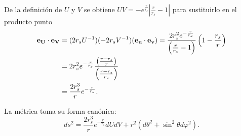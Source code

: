 De la definición de \( U \) y \( V \) se obtiene $UV = -e^{\frac{r}{r_s}}\left|\frac{r}{r_s} - 1\right|$ para sustituirlo en el producto punto
\begin{equation}
    \begin{aligned}
        \mathbf{e_U} \cdot \mathbf{e_V} & = (2r_s U^{-1})(-2r_s V^{-1})(\mathbf{e_u} \cdot \mathbf{e_v}) = \frac{2r_s^2 e^{-\frac{r}{r_s}}}{\left(\frac{r}{r_s} - 1\right)}\left(1-\frac{r_s}{r}\right) \\
                              & =2r_s^2 e^{-\frac{r}{r_s}} \frac{\left(\frac{r - r_s}{r}\right)}{\left(\frac{r -r_s}{r_s}\right)}                                                   \\
                              & = \frac{2r_s^3}{r} e^{-\frac{r}{r_s}}.
    \end{aligned}
\end{equation}

La métrica toma su forma canónica:
\begin{equation}
    ds^2 = \frac{2 r_s^3}{r}e^{-\frac{r}{r_s}} dUdV + r^2(d\theta^2 + \sin^2\theta d\varphi^2).
\end{equation}

